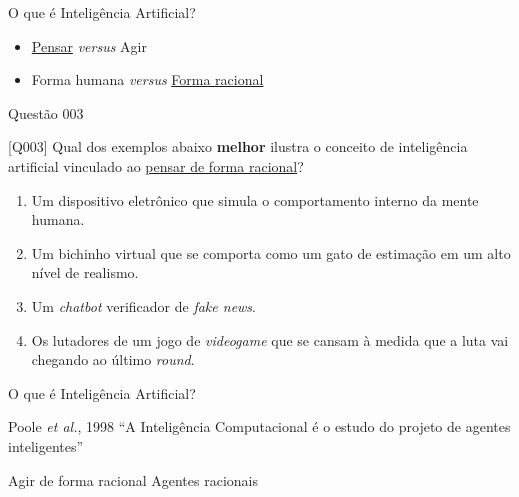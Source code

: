 \documentclass[xcolor=dvipsnames,table]{beamer}
\begin{document}
        \begin{frame}{O que é Inteligência Artificial?}
		\begin{itemize}
			\item \underline{Pensar} {\it versus} Agir
			 \item Forma humana {\it versus} \underline{Forma racional} %
		\end{itemize}
	\end{frame} 

         \begin{frame}{Questão 003}
		\begin{block}{[Q003]}
			Qual dos exemplos abaixo {\bf melhor} ilustra o conceito de inteligência artificial vinculado ao \underline{pensar de forma racional}?
		\end{block}
		\begin{enumerate}[label=(\Alph*)]
			\item Um dispositivo eletrônico que simula o comportamento interno da mente humana.
			\item Um bichinho virtual que se comporta como um gato de estimação em um alto nível de realismo.	
                \item Um {\it chatbot} verificador de {\it fake news}.
			\item Os lutadores de um jogo de {\it videogame} que se cansam à medida que a luta vai chegando ao último {\it round}.
		\end{enumerate}
	\end{frame}
	
	\begin{frame}{O que é Inteligência Artificial?}
		\begin{block}{Poole {\it et al.}, 1998}
			``A Inteligência Computacional é o estudo do projeto de agentes inteligentes''
		\end{block}\pause
		\begin{exampleblock}{Agir de forma racional}
			Agentes racionais
		\end{exampleblock}
	\end{frame}
\end{document}

